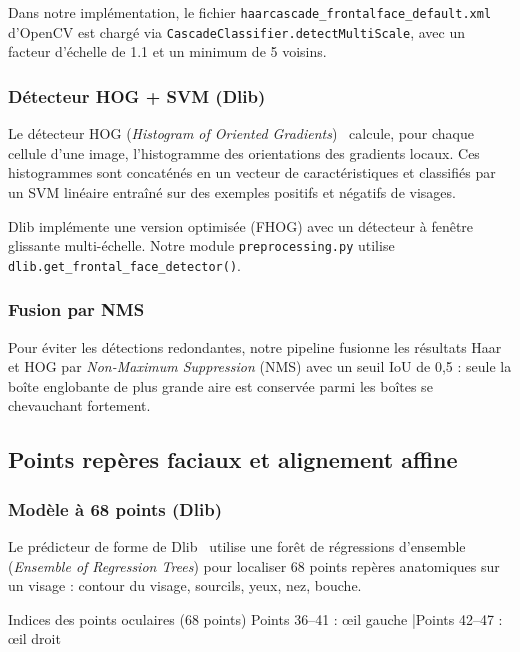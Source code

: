 \documentclass[12pt,a4paper]{article}
\begin{document}
Dans notre implémentation, le fichier
\texttt{haarcascade\_frontalface\_default.xml} d'OpenCV est chargé via
\texttt{CascadeClassifier.detectMultiScale}, avec un facteur d'échelle de 1.1
et un minimum de 5 voisins.

\subsubsection{Détecteur HOG + SVM (Dlib)}

Le détecteur HOG (\textit{Histogram of Oriented Gradients})~\cite{dalal2005}
calcule, pour chaque cellule d'une image, l'histogramme des orientations des
gradients locaux. Ces histogrammes sont concaténés en un vecteur de
caractéristiques et classifiés par un SVM linéaire entraîné sur des exemples
positifs et négatifs de visages.

Dlib implémente une version optimisée (FHOG) avec un détecteur à fenêtre
glissante multi-échelle. Notre module \texttt{preprocessing.py} utilise
\texttt{dlib.get\_frontal\_face\_detector()}.

\subsubsection{Fusion par NMS}

Pour éviter les détections redondantes, notre pipeline fusionne les résultats
Haar et HOG par \textit{Non-Maximum Suppression} (NMS) avec un seuil IoU de 0,5 :
seule la boîte englobante de plus grande aire est conservée parmi les boîtes
se chevauchant fortement.

\subsection{Points repères faciaux et alignement affine}

\subsubsection{Modèle à 68 points (Dlib)}

Le prédicteur de forme de Dlib~\cite{kazemi2014} utilise une forêt de
régressions d'ensemble (\textit{Ensemble of Regression Trees}) pour localiser
68 points repères anatomiques sur un visage : contour du visage, sourcils, yeux,
nez, bouche.

\begin{infobox}{Indices des points oculaires (68 points)}
  Points 36--41 : œil gauche \quad|\quad Points 42--47 : œil droit
\end{infobox}
\end{document}
